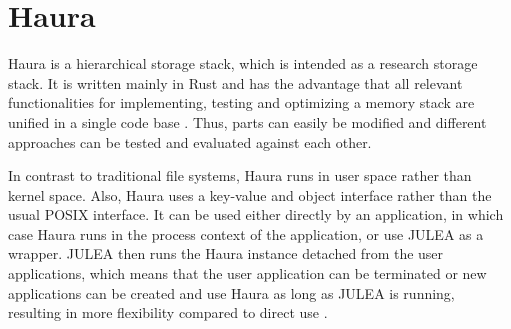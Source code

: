 \documentclass[
	12pt,
	a4paper,
	abstract,
	bibliography=totoc,
	chapterprefix,
	headings=openright,
	numbers=endperiod,
	parskip=half,
	twoside,
]{scrreprt}
\begin{document}
\section{Haura}
\label{sec:haura}

Haura is a hierarchical storage stack, which is intended as a research storage stack.
It is written mainly in Rust and has the advantage that all relevant functionalities for 
implementing, testing and optimizing a memory stack are unified in a single code base \cite{wunsche2022data}. 
Thus, parts can easily be modified and different approaches can be tested and evaluated against each other.

In contrast to traditional file systems, Haura runs in user space rather than kernel space.
Also, Haura uses a key-value and object interface rather than the usual POSIX interface.
It can be used either directly by an application, in which case Haura runs in the process context of the application, or
use JULEA \cite{kuhn2017julea} as a wrapper.
JULEA then runs the Haura instance detached from the user applications, 
which means that the user application can be terminated or new applications can be created and 
use Haura as long as JULEA is running, resulting in more flexibility compared to direct use \cite{hauraDocu}.
\end{document}

